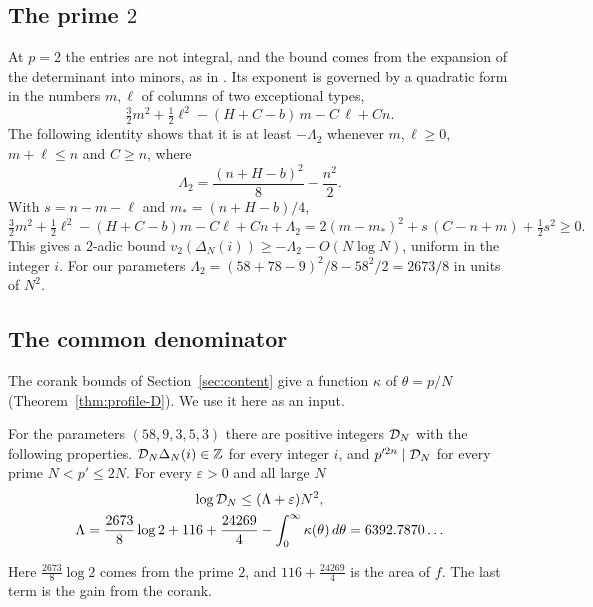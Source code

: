 \subsection{The prime $2$}
At $p=2$ the entries are not integral, and the bound comes from the expansion of the determinant into
minors, as in \cite[\S3]{OpenAI2026}. Its exponent is governed by a quadratic form in the numbers $m,\ell$
of columns of two exceptional types,
\[
 \tfrac32m^2+\tfrac12\ell^2-(H+C-b)\,m-C\,\ell+Cn .
\]
The following identity shows that it is at least $-\Lambda_2$ whenever $m,\ell\ge0$, $m+\ell\le n$ and
$C\ge n$, where
\begin{equation}\label{eq:A2}
 \Lambda_2=\frac{(n+H-b)^2}8-\frac{n^2}2 .
\end{equation}
With $s=n-m-\ell$ and $m_*=(n+H-b)/4$,
\[
 \tfrac32m^2+\tfrac12\ell^2-(H+C-b)m-C\ell+Cn+\Lambda_2
 =2(m-m_*)^2+s\,(C-n+m)+\tfrac12s^2\ge0 .
\]
This gives a $2$-adic bound $v_2(\Delta_N(i))\ge-\Lambda_2-O(N\log N)$, uniform in the integer $i$. For our
parameters $\Lambda_2=(58+78-9)^2/8-58^2/2=2673/8$ in units of $N^2$.

\subsection{The common denominator}
The corank bounds of Section~\ref{sec:content} give a function $\kappa$ of $\theta=p/N$
(Theorem~\ref{thm:profile-D}). We use it here as an input.

\begin{proposition}\label{prop:denominators}
For the parameters $(58,9,3,5,3)$ there are positive integers $\mathcal D_N$ with the following properties.
$\mathcal D_N\Delta_N(i)\in\mathbb Z$ for every integer $i$, and $p'^{2n}\mid\mathcal D_N$ for every prime $N<p'\le2N$. For every
$\varepsilon>0$ and all large $N$
\begin{gather*}
 \log\mathcal D_N\le(\Lambda+\varepsilon)N^2,\\
 \Lambda=\frac{2673}8\log2+116+\frac{24269}4-\int_0^\infty\kappa(\theta)\,d\theta=6392.7870\ldots
\end{gather*}
\end{proposition}

Here $\frac{2673}8\log2$ comes from the prime $2$, and $116+\frac{24269}4$ is the area of $f$. The last term
is the gain from the corank.

